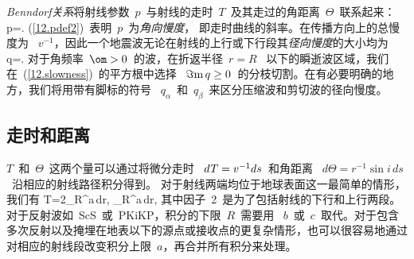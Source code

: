{\em Benndorf关系\/}将射线参数~$p$~与射线的走时~$T$~及其走过的角距离~$\Theta$~联系起来：
%
\eq \label{12.pdef2}
p=.
\en
(\ref{12.pdef2})~表明~$p$~为{\em 角向慢度\/}，
%
%
即走时曲线的斜率。在传播方向上的总慢度为 ~$v^{-1}$，因此一个地震波无论在射线的上行或下行段其{\em 径向慢度\/}的大小均为
%
%
\eq \label{12.slowness}
q=.
\en
对于角频率~$\om>0$~的波，在折返半径~$r=R$ ~以下的瞬逝波区域，我们在~(\ref{12.slowness})~的平方根中选择
~$\Im{\rm m}\,q\geq 0$~的分枝切割。在有必要明确的地方，我们将用带有脚标的符号
~$q_{\alpha}$~和~$q_{\beta}$~来区分压缩波和剪切波的径向慢度。
%

\subsection{走时和距离}
%

$T$~和~$\Theta$~这两个量可以通过将微分走时
~$d\hspace{0.2 mm}T=v^{-1}ds$~和角距离
~$d\Theta=r^{-1}\sin i\,ds$~沿相应的射线路径积分得到。
对于射线两端均位于地球表面这一最简单的情形，我们有
\eq \label{12.DistT}
T=2\int_R^a\,dr,\qquad
{}\int_R^a\,dr,
\en
其中因子~2~是为了包括射线的下行和上行两段。
对于反射波如~ScS~或~PKiKP，积分的下限~$R$~需要用
~$b$~或~$c$~取代。对于包含多次反射以及掩埋在地表以下的源点或接收点的更复杂情形，也可以很容易地通过对相应的射线段改变积分上限~$a$，再合并所有积分来处理。

